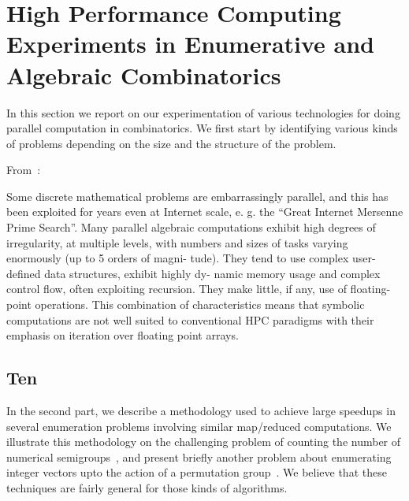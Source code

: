 \documentclass{deliverablereport}
\author{Author names}
\begin{document}
\maketitle
\githubissuedescription

\section{High Performance Computing Experiments in Enumerative and Algebraic Combinatorics}

In this section we report on our experimentation of various technologies for
doing parallel computation in combinatorics. We first start by identifying
various kinds of problems depending on the size and the structure of the
problem.



From~\cite{LoidlTrinder-Hecke}:


\begin{citation}{}
  Some discrete mathematical problems are embarrassingly parallel, and this
  has been exploited for years even at Internet scale, e. g. the “Great
  Internet Mersenne Prime Search”.  Many parallel algebraic computations
  exhibit high degrees of irregularity, at multiple levels, with numbers and
  sizes of tasks varying enormously (up to 5 orders of magni- tude). They tend
  to use complex user-defined data structures, exhibit highly dy- namic memory
  usage and complex control flow, often exploiting recursion. They make
  little, if any, use of floating-point operations.  This combination of
  characteristics means that symbolic computations are not well suited to
  conventional HPC paradigms with their emphasis on iteration over floating
  point arrays.
\end{citation}

\subsection{Ten}



In the second part, we describe a methodology used to achieve large speedups
in several enumeration problems involving similar map/reduced computations. We
illustrate this methodology on the challenging problem of counting the number
of numerical semigroups~\cite{FromentinH16}, and present briefly another
problem about enumerating integer vectors upto the action of a permutation
group~\cite{Borie}. We believe that these techniques are fairly general for
those kinds of algorithms.
\end{document}
